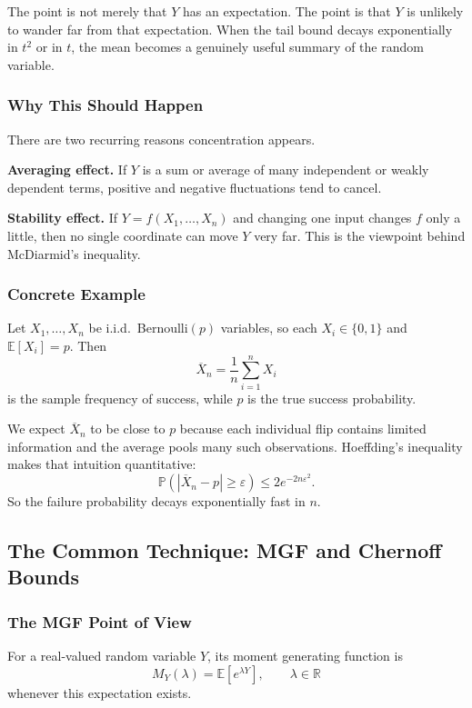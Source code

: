 \documentclass{article}
\theoremstyle{definition}
\theoremstyle{remark}
\newcommand{\EE}{\mathbb{E}}
\newcommand{\PP}{\mathbb{P}}
\begin{document}
The point is not merely that $Y$ has an expectation. The point is that $Y$ is unlikely to wander far from that expectation. When the tail bound decays exponentially in $t^2$ or in $t$, the mean becomes a genuinely useful summary of the random variable.

\subsubsection{Why This Should Happen}

There are two recurring reasons concentration appears.

\textbf{Averaging effect.} If $Y$ is a sum or average of many independent or weakly dependent terms, positive and negative fluctuations tend to cancel.

\textbf{Stability effect.} If $Y=f(X_1,\dots,X_n)$ and changing one input changes $f$ only a little, then no single coordinate can move $Y$ very far. This is the viewpoint behind McDiarmid's inequality.

\subsubsection{Concrete Example}

Let $X_1,\dots,X_n$ be i.i.d.\ Bernoulli$(p)$ variables, so each $X_i \in \{0,1\}$ and $\EE[X_i]=p$. Then
$$
\overline{X}_n = \frac{1}{n}\sum_{i=1}^n X_i
$$
is the sample frequency of success, while $p$ is the true success probability.

We expect $\overline{X}_n$ to be close to $p$ because each individual flip contains limited information and the average pools many such observations. Hoeffding's inequality makes that intuition quantitative:
$$
\PP(|\overline{X}_n-p| \ge \varepsilon) \le 2e^{-2n\varepsilon^2}.
$$
So the failure probability decays exponentially fast in $n$.

\subsection{The Common Technique: MGF and Chernoff Bounds}

\subsubsection{The MGF Point of View}

For a real-valued random variable $Y$, its moment generating function is
$$
M_Y(\lambda) = \EE[e^{\lambda Y}],
\qquad \lambda \in \mathbb{R}
$$
whenever this expectation exists.
\end{document}
